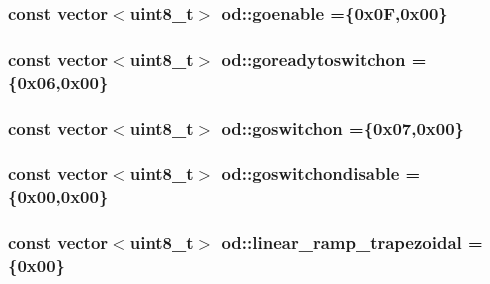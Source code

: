 \subsubsection[{\texorpdfstring{goenable}{goenable}}]{\setlength{\rightskip}{0pt plus 5cm}const vector$<$uint8\+\_\+t$>$ od\+::goenable =\{0x0\+F,0x00\}}\hypertarget{namespaceod_a74448ee88df5960df4c32613e7cdcd53}{}\label{namespaceod_a74448ee88df5960df4c32613e7cdcd53}
\subsubsection[{\texorpdfstring{goreadytoswitchon}{goreadytoswitchon}}]{\setlength{\rightskip}{0pt plus 5cm}const vector$<$uint8\+\_\+t$>$ od\+::goreadytoswitchon =\{0x06,0x00\}}\hypertarget{namespaceod_a360cf2eae7cc59f7bd224fcf5992c767}{}\label{namespaceod_a360cf2eae7cc59f7bd224fcf5992c767}
\subsubsection[{\texorpdfstring{goswitchon}{goswitchon}}]{\setlength{\rightskip}{0pt plus 5cm}const vector$<$uint8\+\_\+t$>$ od\+::goswitchon =\{0x07,0x00\}}\hypertarget{namespaceod_a933f995790a17f6cdd3b54df8f7483a6}{}\label{namespaceod_a933f995790a17f6cdd3b54df8f7483a6}
\subsubsection[{\texorpdfstring{goswitchondisable}{goswitchondisable}}]{\setlength{\rightskip}{0pt plus 5cm}const vector$<$uint8\+\_\+t$>$ od\+::goswitchondisable =\{0x00,0x00\}}\hypertarget{namespaceod_a12f3001ff096334fecb9c9749be4d1c2}{}\label{namespaceod_a12f3001ff096334fecb9c9749be4d1c2}
\subsubsection[{\texorpdfstring{linear\+\_\+ramp\+\_\+trapezoidal}{linear_ramp_trapezoidal}}]{\setlength{\rightskip}{0pt plus 5cm}const vector$<$uint8\+\_\+t$>$ od\+::linear\+\_\+ramp\+\_\+trapezoidal =\{0x00\}}\hypertarget{namespaceod_a8d1e6a3e8180e5d64d68588ee182721c}{}\label{namespaceod_a8d1e6a3e8180e5d64d68588ee182721c}
